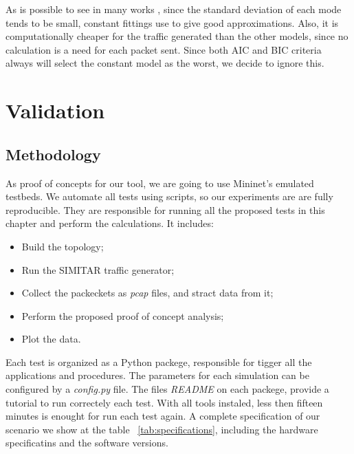 As is possible to see in many works \cite{packet-distribution-model} \cite{udp-flows-model}, since the standard deviation of each mode tends to be small, constant fittings use to give good approximations. Also, it is computationally cheaper for the traffic generated than the other models, since no calculation is a need for each packet sent. Since both AIC and BIC criteria always will select the constant model as the worst, we decide to ignore this.


\section{Validation}\label{sec:validation}


\subsection{Methodology}

As proof of concepts for our tool, we are going to use Mininet's emulated testbeds. We automate all tests using scripts, so our experiments are are fully  reproducible. They are responsible for running all the proposed tests in this chapter and perform the calculations. It includes:

\begin{itemize}
	\item Build the topology;
	\item Run the SIMITAR traffic generator;
	\item Collect the packeckets as \textit{pcap} files, and stract data from it;
	\item Perform the proposed proof of concept analysis;
	\item Plot the data.
\end{itemize}

Each test is organized as a Python packege, responsible for tigger all the applications and procedures. The parameters for each simulation can be configured by a \textit{config.py} file. The files \textit{README} on each packege, provide a tutorial to run correctely each test. With all tools instaled, less then fifteen minutes is enought for run each test again. A complete specification of our scenario we show at the table ~\ref{tab:specifications}, including the hardware specificatins and the software versions. 

